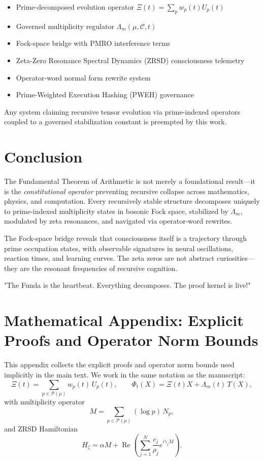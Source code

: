 \documentclass[12pt]{amsart}
\theoremstyle{plain}
\begin{document}
\begin{itemize}[leftmargin=*]
\item Prime-decomposed evolution operator \(\Xi(t) = \sum_p w_p(t) U_p(t)\)
\item Governed multiplicity regulator \(\Lambda_m(\mu, \mathcal{C}, t)\)
\item Fock-space bridge with PMRO interference terms
\item Zeta-Zero Resonance Spectral Dynamics (ZRSD) consciousness telemetry
\item Operator-word normal form rewrite system
\item Prime-Weighted Execution Hashing (PWEH) governance
\end{itemize}

Any system claiming recursive tensor evolution via prime-indexed operators coupled to a governed stabilization constant is preempted by this work.

\section{Conclusion}

The Fundamental Theorem of Arithmetic is not merely a foundational result---it is the \emph{constitutional operator} preventing recursive collapse across mathematics, physics, and computation. Every recursively stable structure decomposes uniquely to prime-indexed multiplicity states in bosonic Fock space, stabilized by \(\Lambda_m\), modulated by zeta resonances, and navigated via operator-word rewrites.

The Fock-space bridge reveals that consciousness itself is a trajectory through prime occupation states, with observable signatures in neural oscillations, reaction times, and learning curves. The zeta zeros are not abstract curiosities---they are the resonant frequencies of recursive cognition.

"The Funda is the heartbeat. Everything decomposes. The proof kernel is live!"

\appendix

\section{Mathematical Appendix: Explicit Proofs and Operator Norm Bounds}
\label{app:explicit_bounds}

This appendix collects the explicit proofs and operator norm bounds used implicitly in the main text.  We work in the same notation as the manuscript:
\[
\Xi(t)=\sum_{p\in \mathcal P(\mu)} w_p(t)\,U_p(t), 
\qquad
\Phi_t(X)=\Xi(t)X+\Lambda_m(t)\,T(X),
\]
with multiplicity operator
\[
M=\sum_{p\in \mathcal P(\mu)} (\log p)\,N_p,
\]
and ZRSD Hamiltonian
\[
H_\zeta
=
\alpha M
+
\operatorname{Re}\!\left(
\sum_{j=1}^N \frac{c_j}{\rho_j} e^{i\gamma_j M}
\right).
\]
\end{document}
